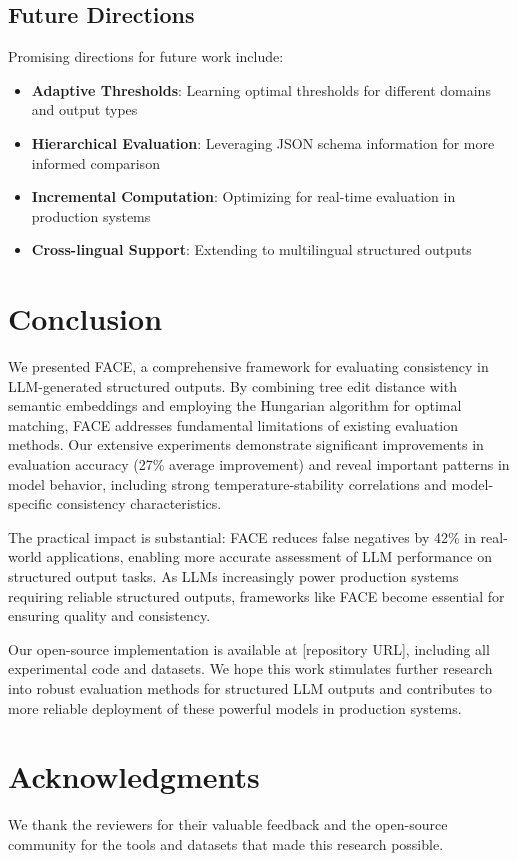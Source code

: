 \documentclass[letterpaper]{article} %
\begin{document}
\subsection{Future Directions}

Promising directions for future work include:
\begin{itemize}
\item \textbf{Adaptive Thresholds}: Learning optimal thresholds for different domains and output types
\item \textbf{Hierarchical Evaluation}: Leveraging JSON schema information for more informed comparison
\item \textbf{Incremental Computation}: Optimizing for real-time evaluation in production systems
\item \textbf{Cross-lingual Support}: Extending to multilingual structured outputs
\end{itemize}

\section{Conclusion}

We presented FACE, a comprehensive framework for evaluating consistency in LLM-generated structured outputs. By combining tree edit distance with semantic embeddings and employing the Hungarian algorithm for optimal matching, FACE addresses fundamental limitations of existing evaluation methods. Our extensive experiments demonstrate significant improvements in evaluation accuracy (27\% average improvement) and reveal important patterns in model behavior, including strong temperature-stability correlations and model-specific consistency characteristics.

The practical impact is substantial: FACE reduces false negatives by 42\% in real-world applications, enabling more accurate assessment of LLM performance on structured output tasks. As LLMs increasingly power production systems requiring reliable structured outputs, frameworks like FACE become essential for ensuring quality and consistency.

Our open-source implementation is available at [repository URL], including all experimental code and datasets. We hope this work stimulates further research into robust evaluation methods for structured LLM outputs and contributes to more reliable deployment of these powerful models in production systems.

\section*{Acknowledgments}

We thank the reviewers for their valuable feedback and the open-source community for the tools and datasets that made this research possible.


\end{document}
